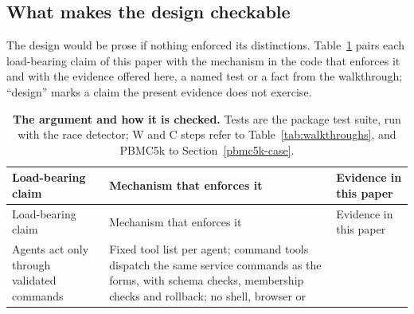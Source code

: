 \documentclass[11pt,a4paper]{article}
\begin{document}
\subsection{What makes the design
checkable}\label{what-makes-the-design-checkable}

The design would be prose if nothing enforced its distinctions. Table~\ref{tab:claims}
pairs each load-bearing claim of this paper with the mechanism in the
code that enforces it and with the evidence offered here, a named test
or a fact from the walkthrough; ``design'' marks a claim the present
evidence does not exercise.

\begin{longtable}[]{@{}
  >{\raggedright\arraybackslash}p{}
  >{\raggedright\arraybackslash}p{}
  >{\raggedright\arraybackslash}p{}@{}}
\caption{\label{tab:claims}\textbf{The argument and how it is checked.} Tests are the
package test suite, run with the race detector; W and C steps refer to
Table~\ref{tab:walkthroughs}, and PBMC5k to Section~\ref{pbmc5k-case}.}\tabularnewline
\toprule\noalign{}
\begin{minipage}[b]{\linewidth}\raggedright
Load-bearing claim
\end{minipage} & \begin{minipage}[b]{\linewidth}\raggedright
Mechanism that enforces it
\end{minipage} & \begin{minipage}[b]{\linewidth}\raggedright
Evidence in this paper
\end{minipage} \\
\midrule\noalign{}
\endfirsthead
\toprule\noalign{}
\begin{minipage}[b]{\linewidth}\raggedright
Load-bearing claim
\end{minipage} & \begin{minipage}[b]{\linewidth}\raggedright
Mechanism that enforces it
\end{minipage} & \begin{minipage}[b]{\linewidth}\raggedright
Evidence in this paper
\end{minipage} \\
\midrule\noalign{}
\endhead
\bottomrule\noalign{}
\endlastfoot
Agents act only through validated commands & Fixed tool list per agent;
command tools dispatch the same service commands as the forms, with
schema checks, membership checks and rollback; no shell, browser or

\end{longtable}
\end{document}
